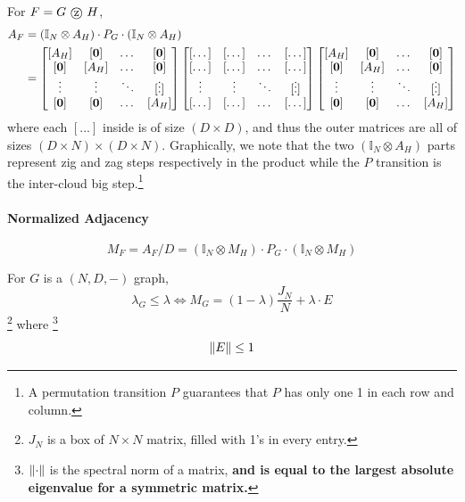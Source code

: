 \begin{proposition}
\label{prop:adjacency of zig zag product}
	For $F = G \tcircle {z} H$, 
	\begin{align}
		A_F 
		&= (\mathbb I _N \otimes A_H ) \cdot P_G \cdot ( \mathbb I _ N \otimes A_H ) \\
		&= \begin{bmatrix}
			[A_H] & [\bzero] & \dots & [\bzero] \\
			[\bzero] & [A_H] & \dots  & [\bzero] \\
			\vdots & \vdots & \ddots & [\vdots] \\
			[\bzero] & [\bzero] & \dots & [A_H]
		\end{bmatrix} \begin{bmatrix}
			[\dots] & [\dots] & \dots & [\dots] \\
			[\dots] & [\dots] & \dots  & [\dots] \\
			\vdots & \vdots & \ddots & [\vdots] \\
			[\dots] & [\dots] & \dots & [\dots]
		\end{bmatrix} \begin{bmatrix}
			[A_H] & [\bzero] & \dots & [\bzero] \\
			[\bzero] & [A_H] & \dots  & [\bzero] \\
			\vdots & \vdots & \ddots & [\vdots] \\
			[\bzero] & [\bzero] & \dots & [A_H]
		\end{bmatrix}
	\end{align}
	where each $[...]$ inside is of size $( D \times D)$, and thus the outer matrices are all of sizes $(D \times N) \times (D \times N )$. Graphically, we note that the two $(\mathbb I _N \otimes A_H )$ parts represent zig and zag steps respectively in the product while the $P$ transition is the inter-cloud big step.\footnote{A permutation transition $P$ guarantees that $P$ has only one 1 in each row and column. } 
	
	\paragraph{Normalized Adjacency}
	\begin{equation}
		M_F = A_F / D = (\mathbb I _N \otimes M_H ) \cdot P_G \cdot ( \mathbb I _ N \otimes M_H )
	\end{equation}
\end{proposition}

\begin{lemma}
	\label{lemma: zig zag la 1}
	For $G$ is a $(N, D, -)$ graph, 
	\begin{equation}
		\lambda_G \leq \lambda \iff M_G = (1 - \lambda) \frac{J_N}{N} + \lambda \cdot E
	\end{equation}\footnote{$J_N$ is a box of $N \times N$ matrix, filled with 1's in every entry.}
	where \footnote{$\left\lVert \cdot \right\rVert$ is the spectral norm of a matrix, \textbf{and is equal to the largest absolute eigenvalue for a symmetric matrix.} }
	\begin{equation}
		\left\lVert E \right\rVert \leq 1
	\end{equation}
\end{lemma}

